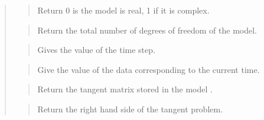 \documentclass[a4paper,11pt,english]{sphinxmanual}
\begin{document}
\sphinxAtStartPar
{}
\begin{quote}

\sphinxAtStartPar
{}
\begin{quote}

\sphinxAtStartPar
Return 0 is the model is real, 1 if it is complex.
\end{quote}

\sphinxAtStartPar
{}
\begin{quote}

\sphinxAtStartPar
Return the total number of degrees of freedom of the model.
\end{quote}

\sphinxAtStartPar
{}
\begin{quote}

\sphinxAtStartPar
Gives the value of the time step.
\end{quote}

\sphinxAtStartPar
{}
\begin{quote}

\sphinxAtStartPar
Give the value of the data  corresponding to the current time.
\end{quote}

\sphinxAtStartPar
{}
\begin{quote}

\sphinxAtStartPar
Return the tangent matrix stored in the model .
\end{quote}

\sphinxAtStartPar
{}
\begin{quote}

\sphinxAtStartPar
Return the right hand side of the tangent problem.
\end{quote}

\sphinxAtStartPar
{}
\begin{quote}


\end{quote}
\end{quote}
\end{document}
